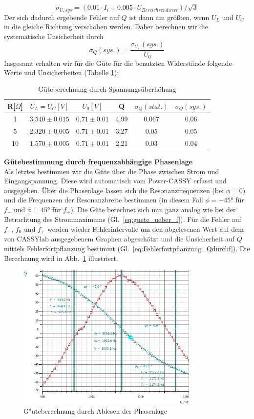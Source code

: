\documentclass[12pt,a4paper]{article}
\begin{document}
\begin{equation}
\sigma_{U,sys}=(0.01\cdot I_i+0.005\cdot U_{Bereichsendwert})/\sqrt{3}
\end{equation}
Der sich dadurch ergebende Fehler auf $Q$ ist dann am größten, wenn $U_L$ und $U_C$ in die gleiche Richtung verschoben werden. Daher berechnen wir die systematische Unsicherheit durch
\begin{equation}
\sigma_Q(sys.)=\frac{\sigma_{U_L}(sys.)}{U_0}
\end{equation}
Insgesamt erhalten wir für die Güte für die benutzten Widerstände folgende Werte und Unsicherheiten (Tabelle \ref{table:S_U}):
\begin{table}[H]
	\centering
	\begin{tabular}{|c|c|c|c|c|c|}
		\hline
		R[$\Omega$]&$U_L=U_C[V]$&$U_0[V]$&Q&$\sigma_Q(stat.)$&$\sigma_Q(sys.)$\\
		\hline
		1&$3.540\pm0.015$&$0.71\pm0.01$&4.99&0.067&0.06\\
		5&$2.320\pm0.005$&$0.71\pm0.01$&3.27&0.05&0.05\\
		10&$1.570\pm0.005$&$0.71\pm0.01$&2.21&0.03&0.04\\
		\hline		
	\end{tabular}
	\caption{Güteberechnung durch Spannungsüberhöhung}
	\label{table:S_U}
\end{table}
\textbf{Gütebestimmung durch frequenzabhängige Phasenlage}\\
Als letztes bestimmen wir die Güte über die Phase zwischen Strom und Eingangspannung. Diese wird automatisch vom Power-CASSY erfasst und ausgegeben. Über die Phasenlage lassen sich die Resonanzfrequenzen (bei $\phi=0$) und die Frequenzen der Resonanzbreite bestimmen (in diesem Fall $\phi=-\ang{45}$ für $f_-$ und $\phi=\ang{45}$ für $f_+$). Die Güte berechnet sich nun ganz analog wie bei der Betrachtung des Strommaximums (Gl.~\eqref{eq:guete_ueber_f}). Für die Fehler auf $f_-$, $f_0$ und $f_+$ werden wieder Fehlerintervalle um den abgelesenen Wert auf dem von CASSYlab ausgegebenem Graphen abgeschätzt und die Unsicherheit auf $Q$ mittels Fehlerfortpflanzung bestimmt (Gl.~\eqref{eq:Fehlerfortpflanzung_Qdurchf}). Die Berechnung wird in Abb.~\ref{S1Ohm_phi} illustriert.
\begin{figure}[H]
	\centering
	\includegraphics[width=0.8\textwidth]{Daten/S1_phi.jpg}
	\caption{G"uteberechnung durch Ablesen der Phasenlage}
	\label{S1Ohm_phi}
\end{figure}
\end{document}
